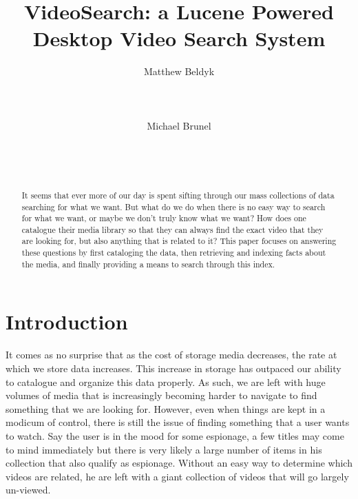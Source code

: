 \documentclass{acm_proc_article-sp}
\begin{document}
\title{VideoSearch: a Lucene Powered Desktop Video Search System}



%
\author{
\alignauthor
Matthew Beldyk\\
       \\
       \\
       \\
\alignauthor
Michael Brunel\\
       \\
       \\
       \\
}
\maketitle
\begin{abstract}

It seems that ever more of our day is spent sifting through our mass collections of data searching for what we want. But what do we do when there is no easy way to search for what we want, or maybe we don't truly know what we want? How does one catalogue their media library so that they can always find the exact video that they are looking for, but also anything that is related to it? This paper focuses on answering these questions by first cataloging the data, then retrieving and indexing facts about the media, and finally providing a means to search through this index.
\end{abstract}

\section{Introduction}
It comes as no surprise that as the cost of storage media decreases, the rate at which we store data increases. This increase in storage has outpaced our ability to catalogue and organize this data properly. As such, we are left with huge volumes of media that is increasingly becoming harder to navigate to find something that we are looking for. However, even when things are kept in a modicum of control, there is still the issue of finding something that a user wants to watch. Say the user is in the mood for some espionage, a few titles may come to mind immediately but there is very likely a large number of items in his collection that also qualify as espionage. Without an easy way to determine which videos are related, he are left with a giant collection of videos that will go largely un-viewed.
\end{document}
